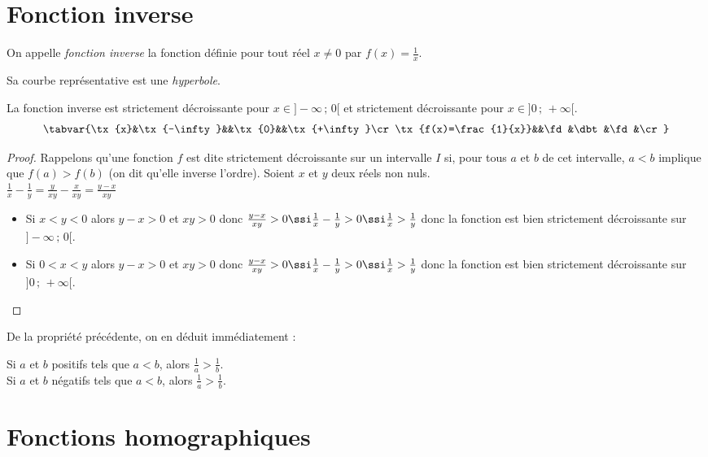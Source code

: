 \sautpage

\section{Fonction inverse}

\begin{definition}
 On appelle \emph{fonction inverse} la fonction d\'efinie pour tout r\'eel $x\neq0$ par $f(x)=\frac{1}{x}$.
\end{definition}

Sa courbe repr\'esentative est une \emph{hyperbole}.

\begin{prop}
 La fonction inverse est strictement d\'ecroissante pour $x\in]-\infty\,;\,0[$ et strictement d\'ecroissante pour $x\in]0\,;\,+\infty[$.
\[\tabvar{%
\tx{x}&\tx{-\infty}&&\tx{0}&&\tx{+\infty}\cr
\tx{f(x)=\frac{1}{x}}&&\fd&\dbt&\fd&\cr
}\]
\end{prop}

\begin{proof}
 Rappelons qu'une fonction $f$ est dite strictement d\'ecroissante sur un intervalle $I$ si, pour tous $a$ et $b$ de cet intervalle, $a<b$ implique que $f(a)>f(b)$ (on dit qu'elle inverse l'ordre).
Soient $x$ et $y$ deux r\'eels non nuls.\\
       $\frac{1}{x}-\frac{1}{y}=\frac{y}{xy}-\frac{x}{xy}=\frac{y-x}{xy}$
\begin{itemize}
 \item Si $x<y<0$ alors $y-x>0$ et $xy>0$ donc $\frac{y-x}{xy}>0 \ssi \frac{1}{x}-\frac{1}{y}>0 \ssi \frac{1}{x}>\frac{1}{y}$ donc la fonction est bien strictement d\'ecroissante sur $]-\infty\,;\,0[$.
 \item Si $0<x<y$ alors $y-x>0$ et $xy>0$ donc $\frac{y-x}{xy}>0 \ssi \frac{1}{x}-\frac{1}{y}>0 \ssi \frac{1}{x}>\frac{1}{y}$ donc la fonction est bien strictement d\'ecroissante sur $]0\,;\,+\infty[$.
\end{itemize}
\end{proof}

De la propri\'et\'e pr\'ec\'edente, on en d\'eduit imm\'ediatement :
\begin{prop}
 Si $a$ et $b$ positifs tels que $a<b$, alors $\frac{1}{a}>\frac{1}{b}$.\\
 Si $a$ et $b$ n\'egatifs tels que $a<b$, alors $\frac{1}{a}>\frac{1}{b}$.
\end{prop}

\section{Fonctions homographiques}


